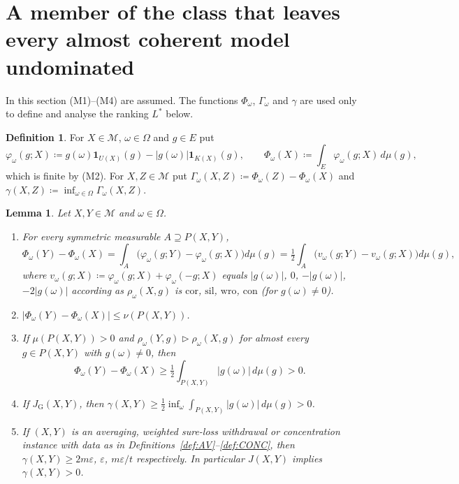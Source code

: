 \documentclass[11pt]{article}
\newtheorem{lemma}[theorem]{Lemma}
\theoremstyle{definition}
\newtheorem{definition}[theorem]{Definition}
\newcommand{\M}{\mathcal M}
\newcommand{\one}{\mathbf 1}
\newcommand{\cor}{\mathrm{cor}}
\newcommand{\sil}{\mathrm{sil}}
\newcommand{\wro}{\mathrm{wro}}
\newcommand{\con}{\mathrm{con}}
\newcommand{\GU}{\mathrm{G}}
\begin{document}
\section{A member of the class that leaves every almost coherent model undominated}\label{sec:existence}

In this section (M1)--(M4) are assumed. The functions $\Phi_\omega$, $\Gamma_\omega$ and $\gamma$ are used only to define and analyse the ranking $L^\ast$ below.

\begin{definition}\label{def:Phi}
For $X\in\M$, $\omega\in\Omega$ and $g\in E$ put
\[
\varphi_\omega(g;X)\coloneqq g(\omega)\one_{U(X)}(g)-|g(\omega)|\one_{K(X)}(g),\qquad \Phi_\omega(X)\coloneqq\int_E\varphi_\omega(g;X)\,d\mu(g),
\]
which is finite by (M2). For $X,Z\in\M$ put $\Gamma_\omega(X,Z)\coloneqq\Phi_\omega(Z)-\Phi_\omega(X)$ and $\gamma(X,Z)\coloneqq\inf_{\omega\in\Omega}\Gamma_\omega(X,Z)$.
\end{definition}

\begin{lemma}\label{lem:Phi}
Let $X,Y\in\M$ and $\omega\in\Omega$.
\begin{enumerate}[label=(\alph*)]
\item For every symmetric measurable $A\supseteq P(X,Y)$,
\[
\Phi_\omega(Y)-\Phi_\omega(X)=\int_A\bigl(\varphi_\omega(g;Y)-\varphi_\omega(g;X)\bigr)d\mu(g)=\tfrac12\int_A\bigl(v_\omega(g;Y)-v_\omega(g;X)\bigr)d\mu(g),
\]
where $v_\omega(g;X)\coloneqq\varphi_\omega(g;X)+\varphi_\omega(-g;X)$ equals $|g(\omega)|$, $0$, $-|g(\omega)|$, $-2|g(\omega)|$ according as $\rho_\omega(X,g)$ is $\cor$, $\sil$, $\wro$, $\con$ (for $g(\omega)\ne0$).
\item $|\Phi_\omega(Y)-\Phi_\omega(X)|\le\nu(P(X,Y))$.
\item If $\mu(P(X,Y))>0$ and $\rho_\omega(Y,g)\rhd\rho_\omega(X,g)$ for almost every $g\in P(X,Y)$ with $g(\omega)\ne0$, then
\[
\Phi_\omega(Y)-\Phi_\omega(X)\ge\tfrac12\int_{P(X,Y)}|g(\omega)|\,d\mu(g)>0.
\]
\item If $J_\GU(X,Y)$, then $\gamma(X,Y)\ge\frac12\inf_{\omega}\int_{P(X,Y)}|g(\omega)|\,d\mu(g)>0$.
\item If $(X,Y)$ is an averaging, weighted sure-loss withdrawal or concentration instance with data as in Definitions~\ref{def:AV}--\ref{def:CONC}, then $\gamma(X,Y)\ge 2m\varepsilon$, $\varepsilon$, $m\varepsilon/t$ respectively. In particular $J(X,Y)$ implies $\gamma(X,Y)>0$.
\end{enumerate}
\end{lemma}
\end{document}
